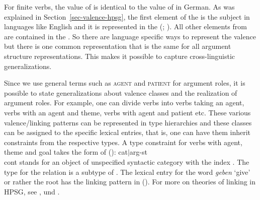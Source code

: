 For finite verbs, the value of \argst is identical to the
value of \comps in German. As was explained in Section~\ref{sec-valence-hpsg}, the first element of the \argstl is the
subject in languages like English and it is represented in the \sprl (\citealt*[Section 4.3, 7.3.1]{SWB2003a}; \citealt{MuellerGermanic}). All other elements from \argst
are contained in the \compsl. So there are language specific ways to represent the valence but there is one
common representation that is the same for all argument structure representations. This makes it
possible to capture cross-linguistic generalizations.

Since we use general terms such as \textsc{agent} and \textsc{patient} for argument roles, it is possible to state generalizations about valence classes and
the realization of argument roles. For example, one can divide verbs into verbs taking an agent, verbs with an agent and theme, verbs with agent and patient etc.
These various valence/linking patterns can be represented in type hierarchies and
these classes can be assigned to the specific lexical entries, that is, one can have them inherit
constraints from the respective types. A type constraint for verbs with agent, theme
and goal takes the form of ():
\ea
\label{ex-agens-theme-goal-linking}
\onems
{ cat$|$arg-st  \\[1mm]
  cont  
}
\z
[] stands for an object of unspecified syntactic category with the index
. 
The type for the relation  is a subtype of .
The lexical entry for the word \emph{geben} `give' or rather the root  has the linking pattern in ().
%
For more on theories of linking in HPSG, see ,  und .

